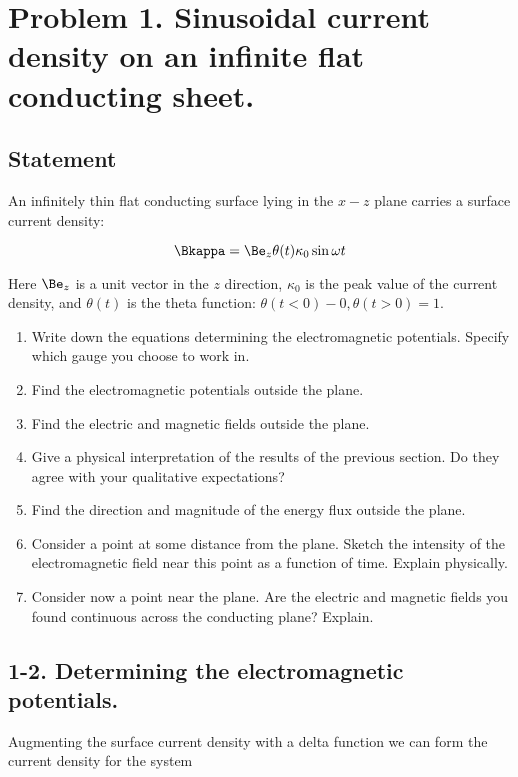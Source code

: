 \section{Problem 1.  Sinusoidal current density on an infinite flat conducting sheet.}
\subsection{Statement}

An infinitely thin flat conducting surface lying in the $x-z$ plane carries a surface current density:

\begin{equation}\label{eqn:relElectroDynProblemSet5P1:10}
\Bkappa = \Be_z \theta(t) \kappa_0 \sin\omega t
\end{equation}

Here $\Be_z$ is a unit vector in the $z$ direction, $\kappa_0$ is the peak value of the current density, and $\theta(t)$ is the theta function: $\theta(t < 0) - 0, \theta(t > 0) = 1$.

\begin{enumerate}
\item Write down the equations determining the electromagnetic potentials.  Specify which gauge you choose to work in.
\item Find the electromagnetic potentials outside the plane.
\item Find the electric and magnetic fields outside the plane.
\item Give a physical interpretation of the results of the previous section.  Do they agree with your qualitative expectations?
\item Find the direction and magnitude of the energy flux outside the plane.
\item Consider a point at some distance from the plane.  Sketch the intensity of the electromagnetic field near this point as a function of time.  Explain physically.
\item Consider now a point near the plane.  Are the electric and magnetic fields you found continuous across the conducting plane?  Explain.
\end{enumerate}

\subsection{1-2.  Determining the electromagnetic potentials.}

Augmenting the surface current density with a delta function we can form the current density for the system

